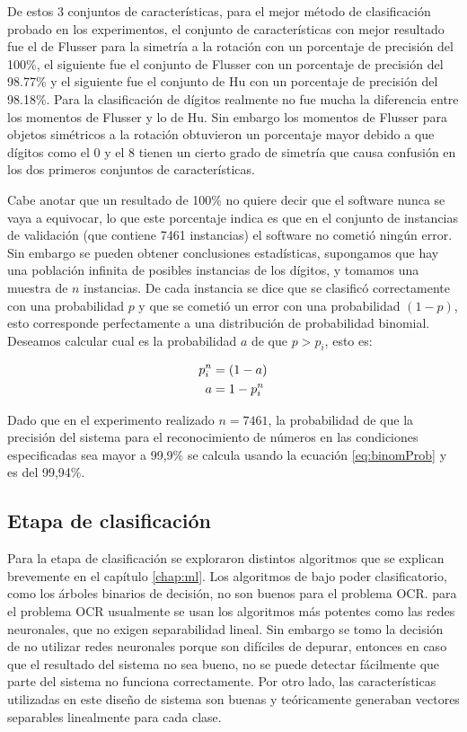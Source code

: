 \documentclass[a4paper, 11pt, oneside]{report}
\begin{document}
De estos 3 conjuntos de características, para el mejor método de clasificación probado en los experimentos, el conjunto de características con mejor resultado fue el de Flusser para la simetría a la rotación con un porcentaje de precisión del 100\%, el siguiente fue el conjunto de Flusser con un porcentaje de precisión del 98.77\% y el siguiente fue el conjunto de Hu con un porcentaje de precisión del 98.18\%. Para la clasificación de dígitos realmente no fue mucha la diferencia entre los momentos de Flusser y lo de Hu. Sin embargo los momentos de Flusser para objetos simétricos a la rotación obtuvieron un porcentaje mayor debido a que dígitos como el 0 y el 8 tienen un cierto grado de simetría que causa confusión en los dos primeros conjuntos de características. 

Cabe anotar que un resultado de 100\% no quiere decir que el software nunca se vaya a equivocar, lo que este porcentaje indica es que en el conjunto de instancias de validación (que contiene 7461 instancias) el software no cometió ningún error. Sin embargo se pueden obtener conclusiones estadísticas, supongamos que hay una población infinita de posibles instancias de los dígitos, y tomamos una muestra de $n$ instancias. De cada instancia se dice que se clasificó correctamente con una probabilidad $p$ y que se cometió un error con una probabilidad $(1-p)$, esto corresponde perfectamente a una distribución de probabilidad binomial. Deseamos calcular cual es la probabilidad $a$ de que $p>p_i$, esto es:

\begin{align}
	p_i^n &= (1-a) \notag \\
	a &= 1-p_i^n \label{eq:binomProb}
\end{align}

Dado que en el experimento realizado $n=7461$, la probabilidad de que la precisión del sistema para el reconocimiento de números en las condiciones especificadas sea mayor a 99,9\% se calcula usando la ecuación \ref{eq:binomProb} y es del 99,94\%.

\subsection{Etapa de clasificación}

Para la etapa de clasificación se exploraron distintos algoritmos que se explican brevemente en el capítulo \ref{chap:ml}. Los algoritmos de bajo poder clasificatorio, como los árboles binarios de decisión, no son buenos para el problema OCR. para el problema OCR usualmente se usan los algoritmos más potentes como las redes neuronales, que no exigen separabilidad lineal. Sin embargo se tomo la decisión de no utilizar redes neuronales porque son difíciles de depurar, entonces en caso que el resultado del sistema no sea bueno, no se puede detectar fácilmente que parte del sistema no funciona correctamente. Por otro lado, las características utilizadas en este diseño de sistema son buenas y teóricamente generaban vectores separables linealmente para cada clase.
\end{document}
